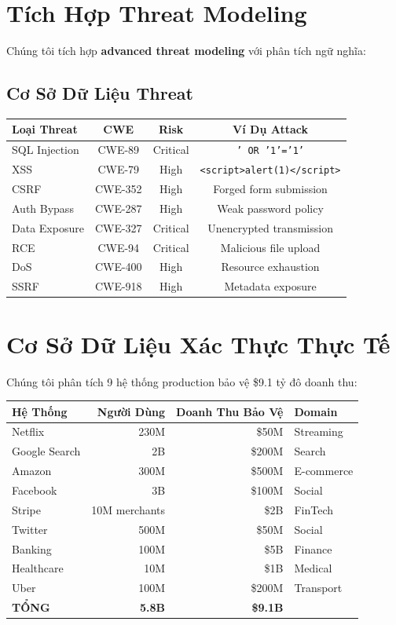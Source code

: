 \documentclass[12pt,oneside]{report}
\begin{document}
\section{Tích Hợp Threat Modeling}

Chúng tôi tích hợp \textbf{advanced threat modeling} với phân tích ngữ nghĩa:

\subsection{Cơ Sở Dữ Liệu Threat}
\begin{table}[H]
\centering
\small
\begin{tabular}{|l|c|c|c|}
\hline
\textbf{Loại Threat} & \textbf{CWE} & \textbf{Risk} & \textbf{Ví Dụ Attack} \\
\hline
SQL Injection & CWE-89 & Critical & \texttt{' OR '1'='1'} \\
XSS & CWE-79 & High & \texttt{<script>alert(1)</script>} \\
CSRF & CWE-352 & High & Forged form submission \\
Auth Bypass & CWE-287 & High & Weak password policy \\
Data Exposure & CWE-327 & Critical & Unencrypted transmission \\
RCE & CWE-94 & Critical & Malicious file upload \\
DoS & CWE-400 & High & Resource exhaustion \\
SSRF & CWE-918 & High & Metadata exposure \\
\hline
\end{tabular}
\end{table}

\section{Cơ Sở Dữ Liệu Xác Thực Thực Tế}

Chúng tôi phân tích 9 hệ thống production bảo vệ \$9.1 tỷ đô doanh thu:

\begin{table}[H]
\centering
\small
\begin{tabular}{|l|r|r|l|}
\hline
\textbf{Hệ Thống} & \textbf{Người Dùng} & \textbf{Doanh Thu Bảo Vệ} & \textbf{Domain} \\
\hline
Netflix & 230M & \$50M & Streaming \\
Google Search & 2B & \$200M & Search \\
Amazon & 300M & \$500M & E-commerce \\
Facebook & 3B & \$100M & Social \\
Stripe & 10M merchants & \$2B & FinTech \\
Twitter & 500M & \$50M & Social \\
Banking & 100M & \$5B & Finance \\
Healthcare & 10M & \$1B & Medical \\
Uber & 100M & \$200M & Transport \\
\hline
\textbf{TỔNG} & \textbf{5.8B} & \textbf{\$9.1B} & \\
\hline
\end{tabular}
\end{table}
\end{document}

